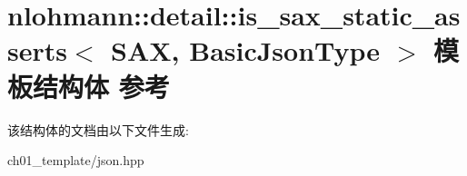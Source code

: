 \hypertarget{structnlohmann_1_1detail_1_1is__sax__static__asserts}{}\section{nlohmann\+::detail\+::is\+\_\+sax\+\_\+static\+\_\+asserts$<$ S\+AX, Basic\+Json\+Type $>$ 模板结构体 参考}
\label{structnlohmann_1_1detail_1_1is__sax__static__asserts}


该结构体的文档由以下文件生成\+:\begin{DoxyCompactItemize}
\item 
ch01\+\_\+template/json.\+hpp\end{DoxyCompactItemize}
